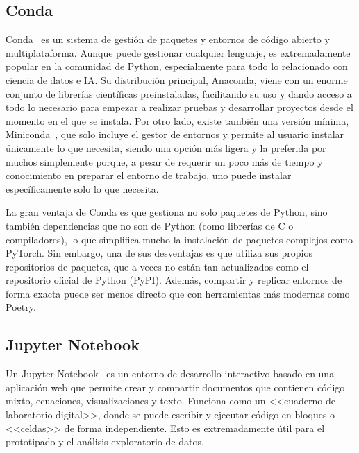 \subsection{Conda}


Conda~\cite{condaDocs} es un sistema de gestión de paquetes y entornos de código abierto y multiplataforma. Aunque puede gestionar cualquier lenguaje, es extremadamente popular en la comunidad de Python, especialmente para todo lo relacionado con ciencia de datos e IA. Su distribución principal, Anaconda, viene con un enorme conjunto de librerías científicas preinstaladas, facilitando su uso y dando acceso a todo lo necesario para empezar a realizar pruebas y desarrollar proyectos desde el momento en el que se instala. Por otro lado, existe también una versión mínima, Miniconda~\cite{minicondaDocs}, que solo incluye el gestor de entornos y permite al usuario instalar únicamente lo que necesita, siendo una opción más ligera y la preferida por muchos simplemente porque, a pesar de requerir un poco más de tiempo y conocimiento en preparar el entorno de trabajo, uno puede instalar específicamente solo lo que necesita.

La gran ventaja de Conda es que gestiona no solo paquetes de Python, sino también dependencias que no son de Python (como librerías de C o compiladores), lo que simplifica mucho la instalación de paquetes complejos como PyTorch. Sin embargo, una de sus desventajas es que utiliza sus propios repositorios de paquetes, que a veces no están tan actualizados como el repositorio oficial de Python (PyPI). Además, compartir y replicar entornos de forma exacta puede ser menos directo que con herramientas más modernas como Poetry.

\subsection{Jupyter Notebook}


Un Jupyter Notebook~\cite{jupyterProject} es un entorno de desarrollo interactivo basado en una aplicación web que permite crear y compartir documentos que contienen código mixto, ecuaciones, visualizaciones y texto. Funciona como un <<cuaderno de laboratorio digital>>, donde se puede escribir y ejecutar código en bloques o <<celdas>> de forma independiente. Esto es extremadamente útil para el prototipado y el análisis exploratorio de datos.

